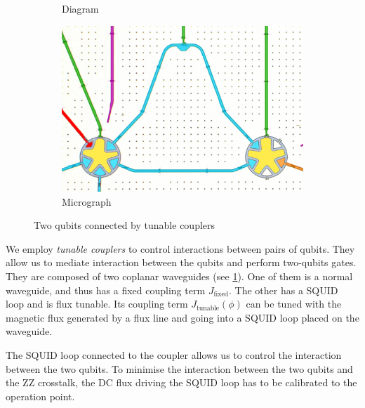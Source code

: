 \begin{figure}[b]
    \centering
    \begin{subfigure}{0.65\textwidth}
        \centering
        
        \vspace{-1cm}
        \caption{Diagram}
        \label{fig:tun_coupl}
    \end{subfigure}
    \hspace{0.3cm}
    \begin{subfigure}{0.25\textwidth}
        \centering
        \includegraphics[width=\textwidth]{Images/Chap1/tun_couplers.png} 
        \caption{Micrograph}
        \label{fig:tun_coupl_real}
    \end{subfigure}
    \caption{Two qubits connected by tunable couplers}
    \label{fig:tun_coupl_tot}
\end{figure}

We employ \emph{tunable couplers} \cite{tun_coupler} to control interactions between pairs of qubits.
They allow us to mediate interaction between the qubits and perform two-qubits gates.
They are composed of two coplanar waveguides (see \cref{fig:tun_coupl}).
One of them is a normal waveguide, and thus has a fixed coupling term $J_\text{fixed}$.
The other has a SQUID loop and is flux tunable.
Its coupling term $J_\text{tunable}(\phi)$ can be tuned with the magnetic flux generated by a flux line and going into a SQUID loop placed on the waveguide.

The SQUID loop connected to the coupler allows us to control the interaction between the two qubits. 
To minimise the interaction between the two qubits and the ZZ crosstalk, the DC flux driving the SQUID loop has to be calibrated to the operation point.

